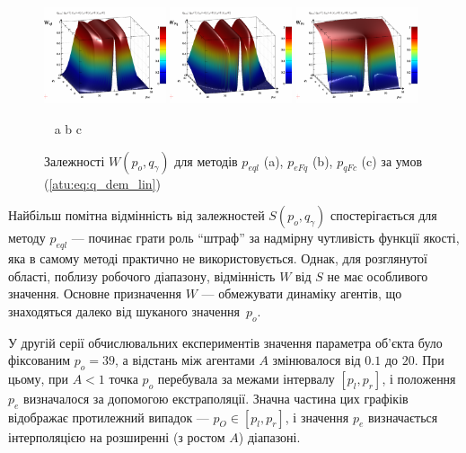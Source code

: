 \begin{figure}[htb!]
  \begin{center}
    \includegraphics[width=0.32\textwidth]{p/qls_pe-p_po_qg_Wql_lin.png}
    \hfill
    \includegraphics[width=0.32\textwidth]{p/qls_pe-p_po_qg_WFq_lin.png}
    \hfill
    \includegraphics[width=0.32\textwidth]{p/qls_pe-p_po_qg_WFc_lin.png}
  \end{center}
  \vspace{-1.0ex}
  \begin{center}
    ~ \hfill a \hfill\hfill b \hfill\hfill c \hfill ~
  \end{center}
  \vspace{-1.5ex}
  \caption{Залежності $W(p_o,q_\gamma)$ для методів $p_{eql}$ (a), $p_{eFq}$ (b), $p_{qFc}$ (c) за умов (\ref{atu:eq:q_dem_lin})}
  \label{atu:f:qsl_W_po_qg_lin}
\end{figure}

Найбільш помітна відмінність від залежностей
$S(p_o, q_\gamma)$ спостерігається для методу
$p_{eql}$ --- починає грати роль ``штраф'' за надмірну
чутливість функції якості, яка в самому методі практично не
використовується. Однак, для розглянутої області, поблизу
робочого діапазону, відмінність
$W$ від
$S$ не має особливого значення. Основне призначення
$W$ --- обмежувати динаміку агентів, що знаходяться далеко від
шуканого значення~$p_o$.


У другій серії обчислювальних експериментів значення параметра об'єкта було
фіксованим $p_o = 39$, а відстань між агентами $A$ змінювалося від $0.1$
до $20$. При цьому, при $A <1$ точка $p_o$ перебувала за межами інтервалу
$[p_l, p_r]$, і положення $p_e$ визначалося за допомогою екстраполяції.
Значна частина цих графіків відображає протилежний випадок --- $p_O \in [p_l,p_r]$,
і значення $p_e$ визначається інтерполяцією на розширенні (з ростом $A$) діапазоні.

